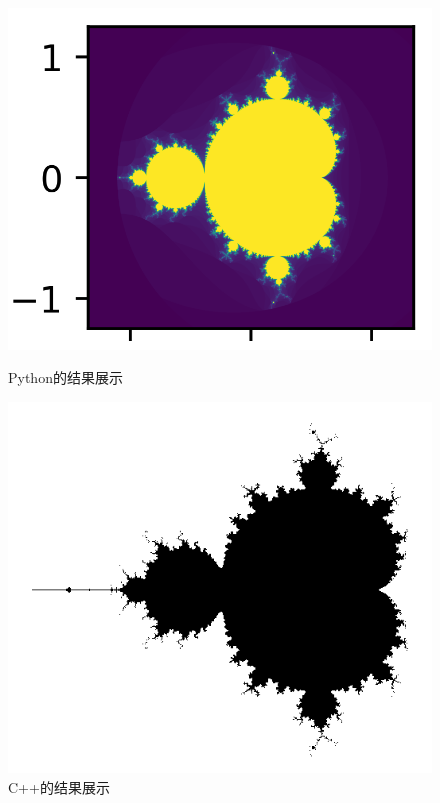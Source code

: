 \documentclass{ctexart}
\begin{document}
\begin{figure}[h]
	\centering
	\begin{minipage}{0.45\linewidth}
		\centering
		\includegraphics[width=0.92\linewidth]{Figure_1.png}
		\caption{\vspace{-0.7cm}Python的结果展示}
		\label{chutian1}%
	\end{minipage}
	\begin{minipage}{0.45\linewidth}
		\centering
		\includegraphics[width=1.0\linewidth]{test.bmp}
		\caption{C++的结果展示}
		\label{chutian2}%
	\end{minipage}
\end{figure}
\end{document}
